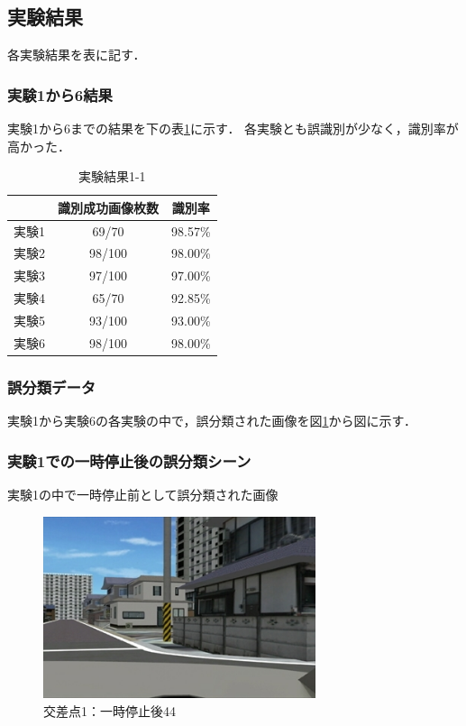 \newpage

\subsection{実験結果}
各実験結果を表に記す．\\

\subsubsection{実験1から6結果}
実験1から6までの結果を下の表\ref{tb:result1-1}に示す．
各実験とも誤識別が少なく，識別率が高かった．\\

\begin{table}[htbp]
  \begin{center}
    \caption{実験結果1-1}
    \begin{tabular}{|c||c|c|} \hline
      & 識別成功画像枚数 & 識別率 \\ \hline \hline
      実験1 & 69/70 & 98.57\% \\ \hline
      実験2 & 98/100 & 98.00\% \\ \hline
      実験3 & 97/100 & 97.00\% \\ \hline
      実験4 & 65/70 & 92.85\% \\ \hline
      実験5 & 93/100 & 93.00\% \\ \hline
      実験6 & 98/100 & 98.00\% \\ \hline
     \end{tabular}
   \label{tb:result1-1}
  \end{center}
\end{table}


\subsubsection*{誤分類データ}
実験1から実験6の各実験の中で，誤分類された画像を図\ref{fig:ds1turn44}から図に示す．\\

\subsubsection*{実験1での一時停止後の誤分類シーン}
実験1の中で一時停止前として誤分類された画像\\

\begin{figure}[htbp]
  \begin{center}
    \includegraphics[clip,width=8.0cm]{./images/ds1turn044.png}
    \caption{交差点1：一時停止後44}
    \label{fig:ds1turn44}
  \end{center}
\end{figure}

